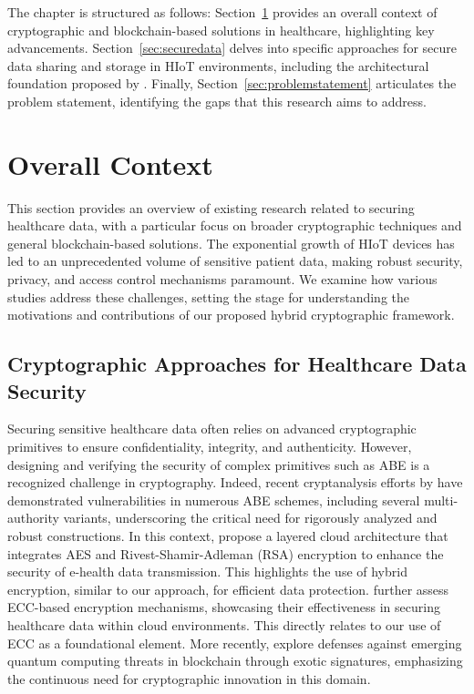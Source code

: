 \documentclass[cic,tc,english]{iiufrgs}
\numberwithin{algorithm}{chapter}
\begin{document}
    The chapter is structured as follows: Section~\ref{sec:overallcontext} provides an overall context of cryptographic and blockchain-based solutions in healthcare, highlighting key advancements. Section~\ref{sec:securedata} delves into specific approaches for secure data sharing and storage in HIoT environments, including the architectural foundation proposed by \citet{laura2023}. Finally, Section~\ref{sec:problemstatement} articulates the problem statement, identifying the gaps that this research aims to address.

    \section{Overall Context}
    \label{sec:overallcontext}

        This section provides an overview of existing research related to securing healthcare data, with a particular focus on broader cryptographic techniques and general blockchain-based solutions. The exponential growth of HIoT devices has led to an unprecedented volume of sensitive patient data, making robust security, privacy, and access control mechanisms paramount. We examine how various studies address these challenges, setting the stage for understanding the motivations and contributions of our proposed hybrid cryptographic framework.

        \subsection{Cryptographic Approaches for Healthcare Data Security}
            Securing sensitive healthcare data often relies on advanced cryptographic primitives to ensure confidentiality, integrity, and authenticity. However, designing and verifying the security of complex primitives such as ABE is a recognized challenge in cryptography. Indeed, recent cryptanalysis efforts by \citet{broken2020} have demonstrated vulnerabilities in numerous ABE schemes, including several multi-authority variants, underscoring the critical need for rigorously analyzed and robust constructions. In this context, \citet{Memos2021} propose a layered cloud architecture that integrates AES and Rivest-Shamir-Adleman (RSA) encryption to enhance the security of e-health data transmission. This highlights the use of hybrid encryption, similar to our approach, for efficient data protection. \citet{Hema2019} further assess ECC-based encryption mechanisms, showcasing their effectiveness in securing healthcare data within cloud environments. This directly relates to our use of ECC as a foundational element. More recently, \citet{Naz2024} explore defenses against emerging quantum computing threats in blockchain through exotic signatures, emphasizing the continuous need for cryptographic innovation in this domain.
\end{document}
